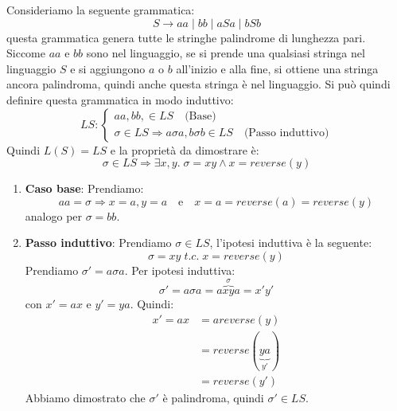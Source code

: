 \documentclass[a4paper]{article}
\begin{document}
\begin{Example}{}{}
Consideriamo la seguente grammatica:
\[
    S \to aa \; | \; bb \; | \; aSa \; | \; bSb
\]
questa grammatica genera tutte le stringhe palindrome di lunghezza pari.
  Siccome \( aa \) e \( bb \) sono nel linguaggio, se si prende una qualsiasi
  stringa nel linguaggio \( S \) e si aggiungono \( a \) o \( b \) all'inizio e
  alla fine, si ottiene una stringa ancora palindroma, quindi anche questa stringa è
  nel linguaggio. Si può quindi definire questa grammatica in modo induttivo:
  \[
    LS: 
    \begin{cases}
      aa, bb, \in LS \quad \text{(Base)} \\
      \sigma \in LS \Rightarrow a\sigma a, b\sigma b \in LS \quad \text{(Passo induttivo)}
    \end{cases}
  \] 
  Quindi \( L(S) = LS \) e la proprietà da dimostrare è:
  \[
    \sigma \in LS \Rightarrow \exists x, y.\; \sigma = x y \land x = reverse(y)
  \] 

  \begin{enumerate}
    \item \textbf{Caso base}: Prendiamo:
      \[
        aa = \sigma \Rightarrow x = a, y = a \quad \text{e} \quad
        x = a = reverse(a) = reverse(y)
      \] 
      analogo per \( \sigma = bb \).

    \item \textbf{Passo induttivo}: Prendiamo \( \sigma \in LS \), l'ipotesi
      induttiva è la seguente:
      \[
        \sigma = xy \;t.c.\; x = reverse(y)
      \] 
      Prendiamo \( \sigma' = a \sigma a \). Per ipotesi induttiva:
      \[
        \sigma' = a \sigma a = a \overbrace{xy}^{\sigma} a = x'y'
      \] 
      con \( x' = ax \) e \( y' = ya \). Quindi:
      \[
        \begin{aligned}
          x' = ax &= a reverse(y) \\
                  &= reverse(\underbrace{ya}_{y'}) \\
                  &= reverse(y')
        \end{aligned}
      \] 
      Abbiamo dimostrato che \( \sigma' \) è palindroma, quindi \( \sigma' \in LS \).
  \end{enumerate}
\end{Example}
\end{document}
